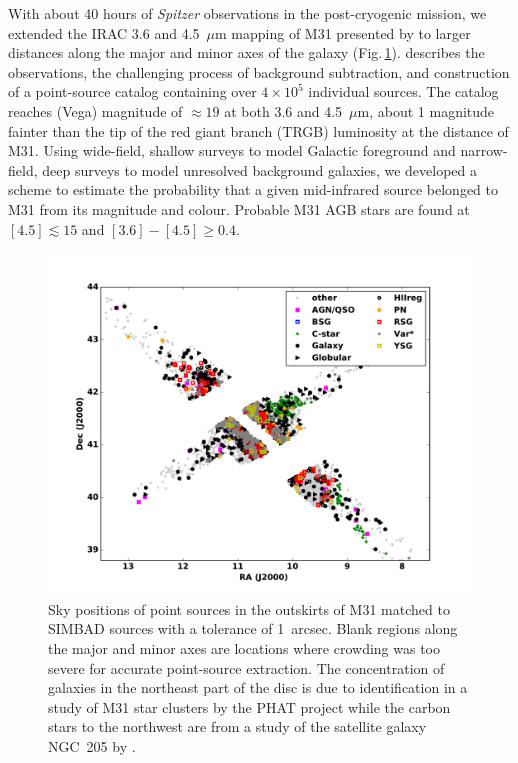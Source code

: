 \documentclass{iau}
\begin{document}
With about 40 hours of {\it Spitzer} observations in the post-cryogenic mission, we extended the IRAC 3.6 and 4.5~$\mu$m
mapping of M31 presented by \cite[Barmby \etal\ (2006)]{barmby06} to larger distances along the major and minor
axes of the galaxy (Fig.\,\ref{fig1}). \cite[Rafiei Ravandi \etal\ (2016)]{rr16} describes the observations, the challenging process of background
subtraction, and construction of a point-source catalog containing over $4\times 10^5$ individual sources. The catalog reaches (Vega)
magnitude of $\approx 19$ at both 3.6 and 4.5~$\mu$m, about 1 magnitude fainter than the tip of the red giant branch (TRGB) luminosity
at the distance of M31. Using wide-field, shallow surveys to model Galactic foreground and narrow-field, deep surveys to model 
unresolved background galaxies, we developed a scheme to estimate the probability that 
a given mid-infrared source belonged to M31 from its magnitude and colour. Probable M31 AGB stars
are found  at $[4.5]\lesssim15$ and $[3.6]-[4.5] \geq 0.4$. 


\begin{figure}[t]
\begin{center}
 \includegraphics[width=5in]{barmby_iaus321_fig1} 
 \caption{Sky positions of point sources in the outskirts of M31 matched to SIMBAD sources with a tolerance of 1~arcsec. 
 Blank regions along the major and minor axes are locations where crowding was too severe for accurate point-source extraction.
The concentration of galaxies in the northeast part of the disc is due to identification in a study of M31 star clusters by the PHAT project 
\cite[(Johnson \etal\ 2012)]{johnson12} 
while the carbon stars to the northwest are from a study of the satellite galaxy NGC~205 by \cite[Demers, Battinelli \& Letarte (2003)]{dbl03}.}
   \label{fig1}
\end{center}
\end{figure}
\end{document}

